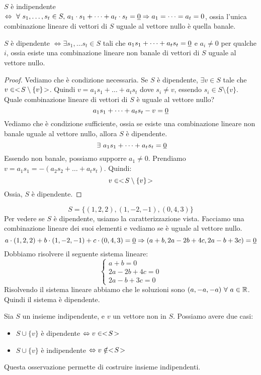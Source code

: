 $S$ \`e indipendente $\iff \forall s_1, \dots, s_t \in S , \, a_1 \cdot s_1 + \dots + a_t \cdot s_t = \nullelement \implies a_1 = \dots = a_t = 0$, ossia l'unica combinazione lineare di vettori di $S$ uguale al vettore nullo \`e quella banale.

$S$ \`e dipendente $\iff \exists s_1, \dots s_t \in S$ tali che $a_1 s_1 + \dots + a_t s_t = \underline{0}$ e $a_i \neq 0$ per qualche $i$, ossia esiste una combinazione lineare non banale di vettori di $S$ uguale al vettore nullo.

\begin{proof}
Vediamo che \`e condizione necessaria. Se $S$ \`e dipendente, $\exists v \in S$ tale che $v \in <\!{S \setminus \{v\}}\!>$. Quindi $v = a_1 s_1 + \dots + a_t s_t$ dove $s_i \neq v$, essendo $s_i \in S \setminus \{v\}$. Quale combinazione lineare di vettori di $S$ \`e uguale al vettore nullo?
\[
a_1 s_1 + \dots + a_t s_t - v = \underline{0}
\]
Vediamo che \`e condizione sufficiente, ossia se esiste una combinazione lineare non banale uguale al vettore nullo, allora $S$ \`e dipendente.
\[
\exists a_1 s_1 + \dots + a_t s_t = \nullelement
\]
Essendo non banale, possiamo supporre $a_1 \neq 0$. Prendiamo $v = a_1 s_1 = -(a_2 s_2 + \dots + a_t s_t)$. Quindi:
\[
v \in <\!{S \setminus \{v\}}\!>
\]
Ossia, $S$ \`e dipendente.
\end{proof}
\[
S = \{ (1, 2, 2) , (1, -2, -1), (0, 4, 3) \}
\]
Per vedere se $S$ \`e dipendente, usiamo la caratterizzazione vista. Facciamo una combinazione lineare dei suoi elementi e vediamo se \`e uguale al vettore nullo.
\[
a \cdot (1, 2, 2) + b \cdot (1, -2, -1) + c \cdot (0, 4, 3) = \underline{0} \Rightarrow
(a + b, 2a - 2b + 4c, 2a - b + 3c) = \underline{0}
\]
Dobbiamo risolvere il seguente sistema lineare:
\[
\begin{cases}
a + b = 0 \\
2a - 2b + 4c = 0 \\
2a - b + 3c = 0
\end{cases}
\]
Risolvendo il sistema lineare abbiamo che le soluzioni sono $(a, -a, -a) \forall a \in \reals$. Quindi il sistema \`e dipendente.

\begin{fact}
Sia $S$ un insieme indipendente, e $v$ un vettore non in $S$. Possiamo avere due casi:
\begin{itemize}
    \item $S \cup \{ v \}$ \`e dipendente $\Leftrightarrow v \in <\!{S}\!>$
    \item $S \cup \{ v \}$ \`e indipendente $\Leftrightarrow v \notin <\!{S}\!>$
\end{itemize}
Questa osservazione permette di costruire insieme indipendenti.
\end{fact}

